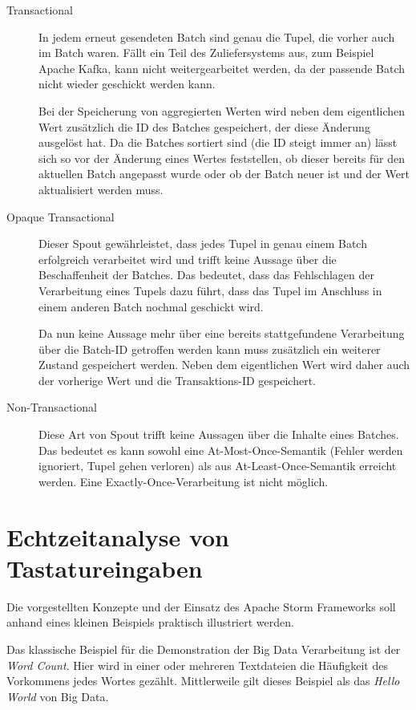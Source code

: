 \documentclass[a4paper,11pt]{scrartcl}
\begin{document}
  \begin{description}
    \item[Transactional] In jedem erneut gesendeten Batch sind genau
      die Tupel, die vorher auch im Batch waren. Fällt ein Teil des
      Zuliefersystems aus, zum Beispiel Apache Kafka, kann nicht
      weitergearbeitet werden, da der passende Batch nicht wieder
      geschickt werden kann.

      Bei der Speicherung von aggregierten Werten wird neben dem eigentlichen
      Wert zusätzlich die ID des Batches gespeichert, der diese Änderung
      ausgelöst hat. Da die Batches sortiert sind (die ID steigt immer an)
      lässt sich so vor der Änderung eines Wertes feststellen, ob dieser
      bereits für den aktuellen Batch angepasst wurde oder ob der Batch neuer
      ist und der Wert aktualisiert werden muss.
    \item[Opaque Transactional]
      Dieser Spout gewährleistet, dass jedes Tupel in genau einem
      Batch erfolgreich verarbeitet wird und trifft keine Aussage über
      die Beschaffenheit der Batches. Das bedeutet, dass das
      Fehlschlagen der Verarbeitung eines Tupels dazu führt, dass das
      Tupel im Anschluss in einem anderen Batch nochmal geschickt
      wird.

      Da nun keine Aussage mehr über eine bereits stattgefundene
      Verarbeitung über die Batch-ID getroffen werden kann muss
      zusätzlich ein weiterer Zustand gespeichert werden. Neben dem
      eigentlichen Wert wird daher auch der vorherige Wert und die
      Transaktions-ID gespeichert.
    \item[Non-Transactional]
      Diese Art von Spout trifft keine Aussagen über die Inhalte eines
      Batches. Das bedeutet es kann sowohl eine At-Most-Once-Semantik
      (Fehler werden ignoriert, Tupel gehen verloren) als aus
      At-Least-Once-Semantik erreicht werden. Eine
      Exactly-Once-Verarbeitung ist nicht möglich.
  \end{description}

  \section{Echtzeitanalyse von Tastatureingaben}
  Die vorgestellten Konzepte und der Einsatz des Apache Storm
  Frameworks soll anhand eines kleinen Beispiels praktisch illustriert
  werden.

  Das klassische Beispiel für die Demonstration der Big Data
  Verarbeitung ist der \textit{Word Count}. Hier wird in einer oder
  mehreren Textdateien die Häufigkeit des Vorkommens jedes Wortes
  gezählt. Mittlerweile gilt dieses Beispiel als das \textit{Hello
  World} von Big Data.
\end{document}
